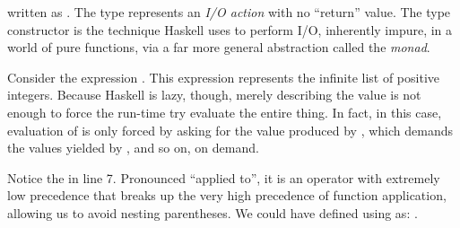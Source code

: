 \begin{notelist}
          written as \code{()}. The type  represents an \textit{I/O action} with no ``return''
          value. The  type constructor is the technique Haskell uses to perform I/O, inherently impure,
          in a world of pure functions, via a far more general abstraction called the \textit{monad}.
    \item Consider the expression \code{[1..]}. This expression represents the infinite list of positive
          integers. Because Haskell is lazy, though, merely describing the value is not enough to force the run-time try
          evaluate the entire thing. In fact, in this case, evaluation of \code{[1..]} is only forced by
           asking for the value produced by , which demands the values yielded by
          , and so on, on demand.
    \item Notice the \code{\$} in line 7. Pronounced ``applied to'', it is an operator with extremely low
          precedence that breaks up the very high precedence of function application, allowing us to avoid nesting
          parentheses. We could have defined  using \code{\$} as:
          . 
\end{notelist}

